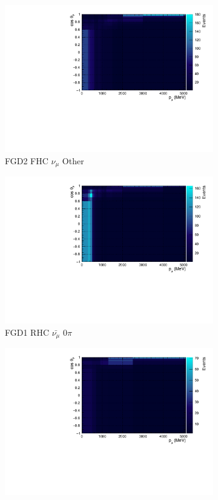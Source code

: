 \begin{figure}
\begin{subfigure}{.32\textwidth}
  \includegraphics[width=0.95\linewidth]{figs/NomMC_MC_FGD2_numuCC_other}
  \caption{FGD2 FHC $\nu_{\mu}$ Other}
  \label{fig:2d_FGD2_numuCC_other}
\end{subfigure}
\centering
\begin{subfigure}{.32\textwidth}
  \centering
  \includegraphics[width=0.95\linewidth]{figs/NomMC_MC_FGD1_anti-numuCC_0pi}
  \caption{FGD1 RHC $\bar{\nu_{\mu}}$ 0$\pi$}
  \label{fig:2d_FGD1_anti-numuCC_0pi}
\end{subfigure}
\begin{subfigure}{.32\textwidth}
  \centering
  \includegraphics[width=0.95\linewidth]{figs/NomMC_MC_FGD1_anti-numuCC_1pi}

\end{subfigure}
\end{figure}

